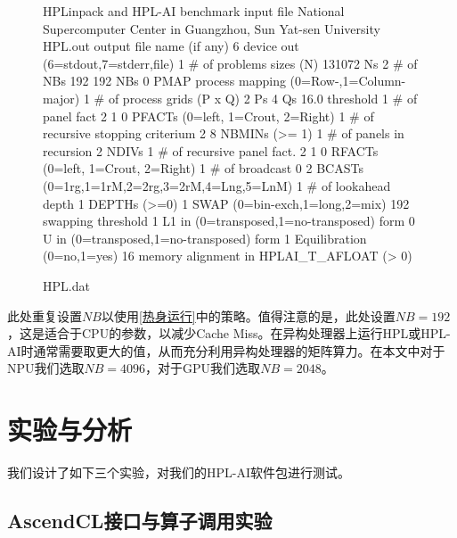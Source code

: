 \begin{figure}[h]
    \centering
    \begin{bash}
        HPLinpack and HPL-AI benchmark input file
        National Supercomputer Center in Guangzhou, Sun Yat-sen University
        HPL.out      output file name (if any)
        6            device out (6=stdout,7=stderr,file)
        1            # of problems sizes (N)
        131072       Ns
        2            # of NBs
        192 192      NBs
        0            PMAP process mapping (0=Row-,1=Column-major)
        1            # of process grids (P x Q)
        2            Ps
        4            Qs
        16.0         threshold
        1            # of panel fact
        2 1 0        PFACTs (0=left, 1=Crout, 2=Right)
        1            # of recursive stopping criterium
        2 8          NBMINs (>= 1)
        1            # of panels in recursion
        2            NDIVs
        1            # of recursive panel fact.
        2 1 0        RFACTs (0=left, 1=Crout, 2=Right)
        1            # of broadcast
        0 2          BCASTs (0=1rg,1=1rM,2=2rg,3=2rM,4=Lng,5=LnM)
        1            # of lookahead depth
        1            DEPTHs (>=0)
        1            SWAP (0=bin-exch,1=long,2=mix)
        192          swapping threshold
        1            L1 in (0=transposed,1=no-transposed) form
        0            U  in (0=transposed,1=no-transposed) form
        1            Equilibration (0=no,1=yes)
        16           memory alignment in HPLAI_T_AFLOAT (> 0)
    \end{bash}
    \caption{HPL.dat}
    \label{HPL.dat}
\end{figure}

此处重复设置$\mathit{NB}$以使用\autoref{热身运行}中的策略。值得注意的是，此处设置$\mathit{NB}=192$，这是适合于CPU的参数，以减少Cache Miss。在异构处理器上运行HPL或HPL-AI时通常需要取更大的值，从而充分利用异构处理器的矩阵算力。在本文中对于NPU我们选取$\mathit{NB}=4096$，对于GPU我们选取$\mathit{NB}=2048$。

\section{实验与分析}

我们设计了如下三个实验，对我们的HPL-AI软件包进行测试。

\subsection{AscendCL接口与算子调用实验}
\label{AscendCL接口与算子调用实验}

